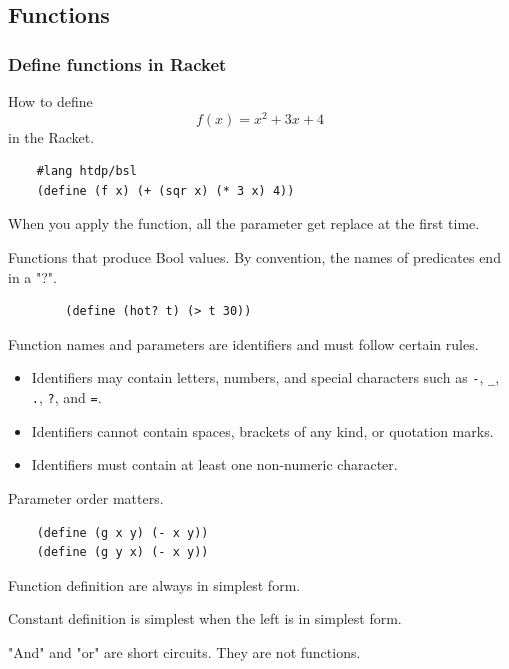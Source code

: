 \subsection{Functions}
\subsubsection{Define functions in Racket}
How to define 
\begin{equation*}
    f(x) = x^2 + 3x + 4
\end{equation*}
in the Racket. 

\begin{verbatim}
    #lang htdp/bsl
    (define (f x) (+ (sqr x) (* 3 x) 4))
\end{verbatim}

\begin{remark}
    When you apply the function, all the parameter get replace at the first time. 
\end{remark}

\begin{definition}
    [Predicates]
    Functions that produce Bool values.
    By convention, the names of predicates end in a "?".  
\end{definition}
\begin{example}
    \begin{verbatim}
        (define (hot? t) (> t 30))
    \end{verbatim}
\end{example}

\begin{definition}[Identifiers]
Function names and parameters are identifiers and must follow certain rules.

\begin{itemize}
    \item Identifiers may contain letters, numbers, and special characters such as
    \texttt{-}, \texttt{\_}, \texttt{.}, \texttt{?}, and \texttt{=}.

    \item Identifiers cannot contain spaces, brackets of any kind, or quotation marks.

    \item Identifiers must contain at least one non-numeric character.
\end{itemize}

Parameter order matters. 
\begin{verbatim}
    (define (g x y) (- x y))
    (define (g y x) (- x y))
\end{verbatim}

Function definition are always in simplest form. 

Constant definition is simplest when the left is in simplest form.

"And" and "or" are short circuits. They are not functions. 

\end{definition}
